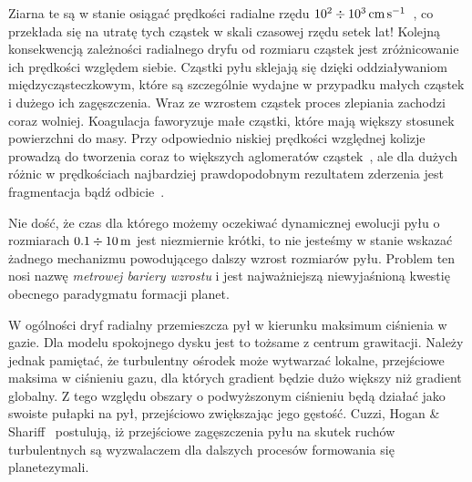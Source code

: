 Ziarna te są w stanie osiągać prędkości radialne rzędu
$10^2\div10^3\hbox{$\thinspace\textrm{cm}$}\hbox{$\thinspace\textrm{s}$}^{-1}$~\cite{W77}, co przekłada się na utratę
tych cząstek w skali czasowej rzędu setek lat!  Kolejną konsekwencją zależności
radialnego dryfu od rozmiaru cząstek jest zróżnicowanie ich prędkości względem
siebie. Cząstki pyłu sklejają się dzięki oddziaływaniom międzycząsteczkowym,
które są szczególnie wydajne w przypadku małych cząstek i dużego ich
zagęszczenia. Wraz ze wzrostem cząstek proces zlepiania zachodzi coraz wolniej.
Koagulacja faworyzuje małe cząstki, które mają większy stosunek powierzchni do
masy. Przy odpowiednio niskiej prędkości względnej kolizje prowadzą do tworzenia
coraz to większych aglomeratów cząstek~\citep{BW08}, ale dla dużych różnic w
prędkościach najbardziej prawdopodobnym rezultatem zderzenia jest
fragmentacja bądź odbicie~\citep{Z10}. 
\par Nie dość, że czas dla którego możemy oczekiwać dynamicznej ewolucji pyłu o
rozmiarach $0.1 \div 10\hbox{$\thinspace\textrm{m}$}$ jest niezmiernie krótki, to nie jesteśmy w stanie
wskazać żadnego mechanizmu powodującego dalszy wzrost rozmiarów pyłu. Problem
ten nosi nazwę \emph{metrowej bariery wzrostu} i jest najważniejszą
niewyjaśnioną kwestię obecnego paradygmatu formacji planet.
\par W ogólności dryf radialny przemieszcza pył w kierunku maksimum ciśnienia w
gazie. Dla modelu spokojnego dysku jest to tożsame z centrum grawitacji. Należy
jednak pamiętać, że turbulentny ośrodek może wytwarzać lokalne, przejściowe
maksima w ciśnieniu gazu, dla których gradient będzie dużo większy niż gradient
globalny. Z tego względu obszary o podwyższonym ciśnieniu będą działać jako
swoiste pułapki na pył, przejściowo zwiększając jego gęstość. 
Cuzzi, Hogan \& Shariff~\citep{CHS08} postulują, iż przejściowe zagęszczenia
pyłu na skutek ruchów turbulentnych są wyzwalaczem dla dalszych procesów
formowania się planetezymali.
